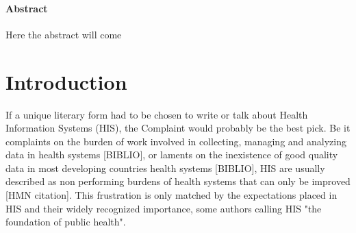 \documentclass[a4paper,11pt,final,twoside]{article}
\begin{document}
\newpage\null\thispagestyle{empty}\newpage








\thispagestyle{plain}
\setcounter{page}{1}



\paragraph{Abstract}

Here the abstract will come

\cleardoublepage
\tableofcontents
{}
\newpage
{}
\listoffigures
\newpage
{}
\listoftables

\thispagestyle{fancy}

\sloppy


\cleardoublepage
{}
\setcounter{page}{1}

\section{Introduction}

If a unique literary form had to be chosen to write or talk about Health Information Systems (HIS), the Complaint would probably be the best pick. Be it complaints on the burden of work involved in collecting, managing and analyzing data in health systems [BIBLIO], or laments on the inexistence of good quality data in most developing countries health systems [BIBLIO], HIS are usually described as non performing burdens of health systems that can only be improved [HMN citation]. This frustration is only matched by the expectations placed in HIS and their widely recognized importance, some authors calling HIS "the foundation of public health"\cite{foundph}.
\end{document}
